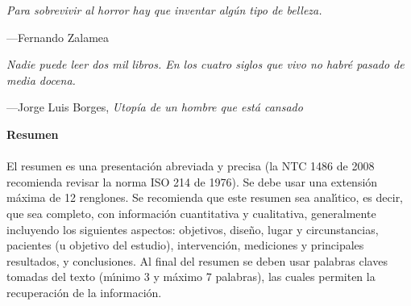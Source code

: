 \thispagestyle{empty}
\null
\clearpage%
\clearpage
\thispagestyle{empty}
\begin{flushright}
   \begin{minipage}{0.6\textwidth}
      \raggedleft
      \textit{Para sobrevivir al horror hay que inventar algún tipo de belleza.}\par
      \vspace{1ex}
      ---Fernando Zalamea\footnotemark
   \end{minipage}
\end{flushright}

\vspace{3cm}

\begin{flushright}
   \begin{minipage}{0.6\textwidth}
      \raggedleft
      \textit{Nadie puede leer dos mil libros. En los cuatro siglos que vivo no habré pasado de media docena.}\par
      \vspace{1ex}
      ---Jorge Luis Borges, \textit{Utopía de un hombre que está cansado}
   \end{minipage}
\end{flushright}
\vspace*{\fill}
\clearpage
\clearpage
\thispagestyle{empty}
\null
\clearpage

\newpage
\textbf{\LARGE Resumen}\\\\
El resumen es una presentaci\'{o}n abreviada y precisa (la NTC 1486 de 2008 recomienda revisar la norma ISO 214 de 1976). Se debe usar una extensi\'{o}n m\'{a}xima de 12 renglones. Se recomienda que este resumen sea anal\'{\i}tico, es decir, que sea completo, con informaci\'{o}n cuantitativa y cualitativa, generalmente incluyendo los siguientes aspectos: objetivos, dise\~{n}o, lugar y circunstancias, pacientes (u objetivo del estudio), intervenci\'{o}n, mediciones y principales resultados, y conclusiones. Al final del resumen se deben usar palabras claves tomadas del texto (m\'{\i}nimo 3 y m\'{a}ximo 7 palabras), las cuales permiten la recuperaci\'{o}n de la informaci\'{o}n.\\

